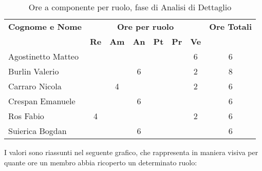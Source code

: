 \begin{table}[h]
	\centering
	\begin{tabular}{|l|c|c|c|c|c|c|c|}
		\toprule
		\textbf{Cognome e Nome} & \multicolumn{6}{c}{\textbf{Ore per ruolo}} & \textbf{Ore Totali} \\
		& \textbf{Re} & \textbf{Am} & \textbf{An} & \textbf{Pt} & \textbf{Pr} & \textbf{Ve} & \\
		
		\midrule
		Agostinetto Matteo & & & & & & 6 & 6 \\
		Burlin Valerio & & & 6 & & & 2 & 8 \\ 
		Carraro Nicola & & 4 & & & & 2 & 6 \\
		Crespan Emanuele & & & 6 & & & & 6 \\
		Ros Fabio & 4 & & & & & 2 & 6 \\
		Suierica Bogdan & & & 6 & & & & 6 \\
		
		\bottomrule
	\end{tabular}
	\caption{Ore a componente per ruolo, fase di Analisi di Dettaglio}
\end{table}

\noindent I valori sono riassunti nel seguente grafico, che rappresenta in maniera visiva per quante ore un membro abbia ricoperto un determinato ruolo:

